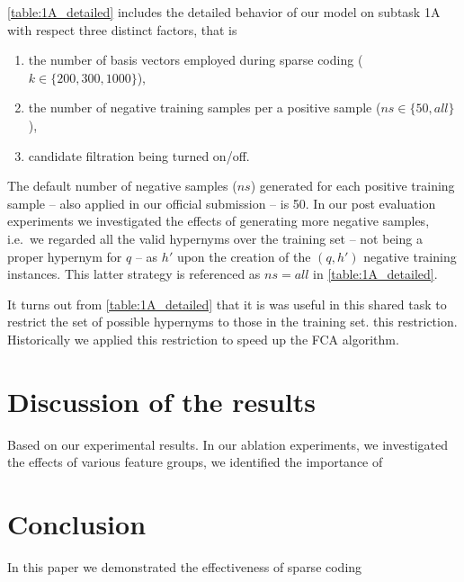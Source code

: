 \documentclass[11pt,a4paper]{article}
\begin{document}
\autoref{table:1A_detailed} includes the detailed behavior of our model on 
subtask 1A with respect three distinct factors, that is
\begin{enumerate}
	\item the number of basis vectors employed during sparse coding ($k \in 
	\{200, 300, 1000\}$),
	\item the number of negative training samples per a positive sample ($ns 
	\in \{50, all\}$),
	\item candidate filtration being turned on/off.
\end{enumerate}
The default number of negative samples ($ns$) generated for
each positive training sample -- also applied in our official submission -- is 
50. In our post evaluation experiments we investigated the effects of 
generating more negative samples, i.e.~we regarded all the valid hypernyms over 
the training set -- not being a
proper hypernym for $q$ -- as $h'$ upon the creation of the $(q, h')$ negative 
training instances. This latter strategy is referenced as $ns=all$ in 
\autoref{table:1A_detailed}.




It turns out from \autoref{table:1A_detailed} that it is was useful in this
shared task to restrict the set of possible hypernyms to those in the training
set. %
this restriction. Historically we applied this restriction to speed up the FCA
algorithm.

%

\section{Discussion of the results}

Based on our experimental results. In our ablation experiments, we investigated 
the effects of various feature groups, we identified the importance of 

\section{Conclusion}

In this paper we demonstrated the effectiveness of sparse coding 



\end{document}
